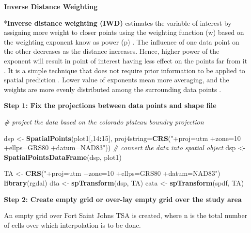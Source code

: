 \documentclass[
]{book}
\newenvironment{Shaded}{\begin{snugshade}}{\end{snugshade}}
\newcommand{\AttributeTok}[1]{\textcolor[rgb]{0.13,0.29,0.53}{#1}}
\newcommand{\CommentTok}[1]{\textcolor[rgb]{0.56,0.35,0.01}{\textit{#1}}}
\newcommand{\DecValTok}[1]{\textcolor[rgb]{0.00,0.00,0.81}{#1}}
\newcommand{\FunctionTok}[1]{\textcolor[rgb]{0.13,0.29,0.53}{\textbf{#1}}}
\newcommand{\NormalTok}[1]{#1}
\newcommand{\OtherTok}[1]{\textcolor[rgb]{0.56,0.35,0.01}{#1}}
\newcommand{\SpecialCharTok}[1]{\textcolor[rgb]{0.81,0.36,0.00}{\textbf{#1}}}
\newcommand{\StringTok}[1]{\textcolor[rgb]{0.31,0.60,0.02}{#1}}
\begin{document}
\textbf{Inverse Distance Weighting}

*\textbf{Inverse distance weighting (IWD)} \citep{shepard_two-_1968} estimates the variable of interest by assigning more weight to closer points using the weighting function (w) based on the weighting exponent know as power (p) \citep{babak_statistical_2009}. The influence of one data point on the other decreases as the distance increases. Hence, higher power of the exponent will result in point of interest having less effect on the points far from it \citep{babak_statistical_2009}. It is a simple technique that does not require prior information to be applied to spatial prediction \citep{shepard_two-_1968}. Lower value of exponents mean more averaging, and the weights are more evenly distributed among the surrounding data points \citep{shepard_two-_1968}.

\textbf{Step 1: Fix the projections between data points and shape file}

\begin{Shaded}
\begin{Highlighting}[]
\CommentTok{\# project the data based on the colorado plateau boundry projection}

\NormalTok{dsp }\OtherTok{\textless{}{-}} \FunctionTok{SpatialPoints}\NormalTok{(plot1[,}\DecValTok{14}\SpecialCharTok{:}\DecValTok{15}\NormalTok{], }\AttributeTok{proj4string=}\FunctionTok{CRS}\NormalTok{(}\StringTok{"+proj=utm +zone=10 +ellps=GRS80 +datum=NAD83"}\NormalTok{))}
\CommentTok{\# convert the data into spatial object}
\NormalTok{dsp }\OtherTok{\textless{}{-}} \FunctionTok{SpatialPointsDataFrame}\NormalTok{(dsp, plot1)}

\NormalTok{TA }\OtherTok{\textless{}{-}} \FunctionTok{CRS}\NormalTok{(}\StringTok{"+proj=utm +zone=10 +ellps=GRS80 +datum=NAD83"}\NormalTok{)}
\FunctionTok{library}\NormalTok{(rgdal)}
\NormalTok{dta }\OtherTok{\textless{}{-}} \FunctionTok{spTransform}\NormalTok{(dsp, TA)}
\NormalTok{cata }\OtherTok{\textless{}{-}} \FunctionTok{spTransform}\NormalTok{(spdf, TA)}
\end{Highlighting}
\end{Shaded}

\textbf{Step 2: Create empty grid or over-lay empty grid over the study area}

An empty grid over Fort Saint Johns TSA is created, where n is the total number of cells over which interpolation is to be done.
\end{document}
